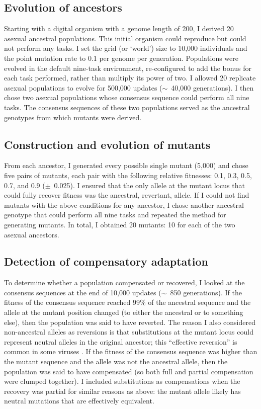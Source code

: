 \begin{doublespace}
\subsection{Evolution of ancestors}

Starting with a digital organism with a genome length of 200,
I derived 20 asexual ancestral populations.
%
This initial organism could reproduce but could not perform any tasks.
%
I set the grid (or `world') size to 10,000 individuals
and the point mutation rate to 0.1 per genome per generation.
%
Populations were evolved in the default nine-task environment,
re-configured to add the bonus for each task performed,
rather than multiply its power of two.
%
I allowed 20 replicate asexual populations
to evolve for 500,000 updates ($\sim$~40,000 generations).
%
I then chose two asexual populations
whose consensus sequence could perform all nine tasks.
%
The consensus sequences of these two populations
served as the ancestral genotypes from which mutants were derived.


\subsection{Construction and evolution of mutants}

From each ancestor, I generated every possible single mutant (5,000)
and chose five pairs of mutants,
each pair with the following relative fitnesses:
0.1, 0.3, 0.5, 0.7, and 0.9 ($\pm$~0.025).
%
I ensured that the only allele at the mutant locus
that could fully recover fitness was the ancestral, revertant, allele.
%
If I could not find mutants with the above conditions for any ancestor,
I chose another ancestral genotype that could perform all nine tasks
and repeated the method for generating mutants.
%
In total, I obtained 20 mutants: 10 for each of the two asexual ancestors.


\subsection{Detection of compensatory adaptation}

To determine whether a population compensated or recovered,
I looked at the consensus sequences at the end of 10,000 updates
($\sim$~850 generations).
%
If the fitness of the consensus sequence reached 99\% of the
ancestral sequence and the allele at the mutant position
changed (to either the ancestral or to something else),
then the population was said to have reverted.
%
The reason I also considered non-ancestral alleles as reversions
is that substitutions at the mutant locus could represent
neutral alleles in the original ancestor;
this ``effective reversion'' is common in some viruses \citep{arg07}.
%
If the fitness of the consensus sequence was higher than the
mutant sequence and the allele was not the ancestral allele,
then the population was said to have compensated
(so both full and partial compensation were clumped together).
%
I included substitutions as compensations when the recovery
was partial for similar reasons as above: the mutant allele
likely has neutral mutations that are effectively equivalent.




\end{doublespace}
